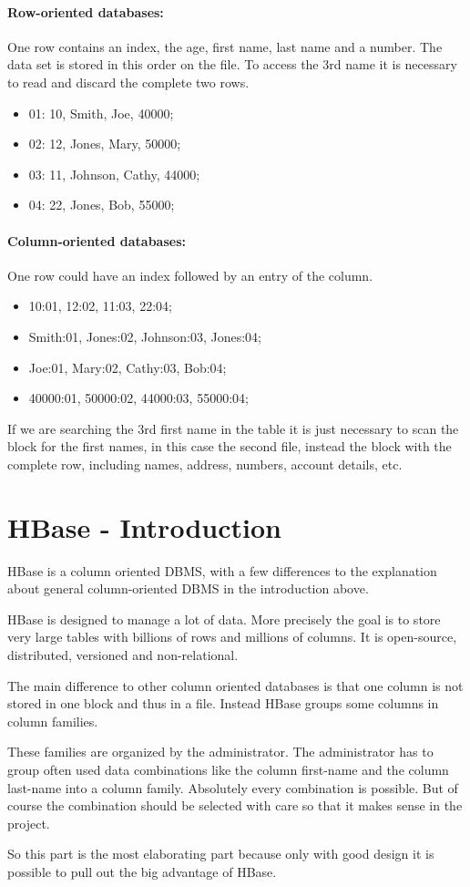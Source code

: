 \paragraph{Row-oriented databases:}
One row contains an index, the age, first name, last name and a number.
The data set is stored in this order on the file. 
To access the 3rd name it is necessary to read and discard the complete two rows.
\begin{itemize}
	\item 01: 10, Smith, Joe, 40000; 
	\item 02: 12, Jones, Mary, 50000; 
	\item 03: 11, Johnson, Cathy, 44000; 
	\item 04: 22, Jones, Bob, 55000;
\end{itemize}


\paragraph{Column-oriented databases:}
One row could have an index followed by an entry of the column.
\begin{itemize}
	\item 10:01, 12:02, 11:03, 22:04;
	\item Smith:01, Jones:02, Johnson:03, Jones:04;
	\item Joe:01, Mary:02, Cathy:03, Bob:04;
	\item 40000:01, 50000:02, 44000:03, 55000:04;
\end{itemize}
If we are searching the 3rd first name in the table it is just necessary to scan the block for the first names, in this case the second file, instead the block with the complete row, including names, address, numbers, account details, etc. 


\newpage
\section{HBase - Introduction}
HBase is a column oriented DBMS, with a few differences to the explanation about general column-oriented DBMS in the introduction above.

HBase is designed to manage a lot of data. 
More precisely the goal is to store very large tables with billions of rows and millions of columns.
It is open-source, distributed, versioned and non-relational.
\cite{hbase.apache.foundation.2017} \cite{hbase.hortonworks.2017}

The main difference to other column oriented databases is that one column is not stored in one block and thus in a file. 
Instead HBase groups some columns in column families.
\cite{hbase.daniel.abadi.2010}

These families are organized by the administrator.
The administrator has to group often used data combinations like the column first-name and the column last-name into a column family.
Absolutely every combination is possible.
But of course the combination should be selected with care so that it makes sense in the project.
\cite{hbase.daniel.abadi.2010}

So this part is the most elaborating part because only with good design it is possible to pull out the big advantage of HBase.
